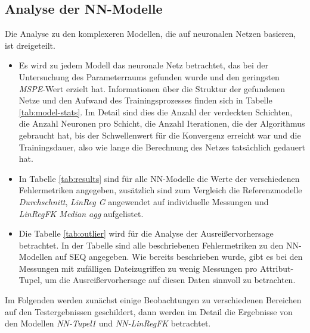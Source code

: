 \documentclass[
	twoside,
	12pt,
	a4paper,
	BCOR10mm,
	DIV14,
	listof=totoc,
	bibliography=totoc,
	headsepline
]{scrreprt}
\begin{document}
\subsection{Analyse der NN-Modelle}
Die Analyse zu den komplexeren Modellen, die auf neuronalen Netzen basieren, ist dreigeteilt. 
\begin{itemize}
	\item Es wird zu jedem Modell das neuronale Netz betrachtet, das bei der Untersuchung des Parameterraums gefunden wurde und den geringsten \textit{MSPE}-Wert erzielt hat.
Informationen über die Struktur der gefundenen Netze und den Aufwand des Trainingsprozesses finden sich in Tabelle \ref{tab:model-stats}. Im Detail sind dies die Anzahl der verdeckten Schichten, die Anzahl Neuronen pro Schicht, die Anzahl Iterationen, die der Algorithmus gebraucht hat, bis der Schwellenwert für die Konvergenz erreicht war und die Trainingsdauer, also wie lange die Berechnung des Netzes tatsächlich gedauert hat.
	\item In Tabelle \ref{tab:results} sind für alle NN-Modelle die Werte der verschiedenen Fehlermetriken angegeben, zusätzlich sind zum Vergleich die Referenzmodelle \textit{Durchschnitt}, \textit{LinReg G} angewendet auf individuelle Messungen und \textit{LinRegFK Median agg} aufgelistet.
	\item Die Tabelle \ref{tab:outlier} wird für die Analyse der Ausreißervorhersage betrachtet. In der Tabelle sind alle beschriebenen Fehlermetriken zu den NN-Modellen auf SEQ angegeben. Wie bereits beschrieben wurde, gibt es bei den Messungen mit zufälligen Dateizugriffen zu wenig Messungen pro Attribut-Tupel, um die Ausreißervorhersage auf diesen Daten sinnvoll zu betrachten.
\end{itemize}
Im Folgenden werden zunächst einige Beobachtungen zu verschiedenen Bereichen auf den Testergebnissen geschildert, dann werden im Detail die Ergebnisse von den Modellen \textit{NN-Tupel1} und \textit{NN-LinRegFK} betrachtet.
\end{document}
